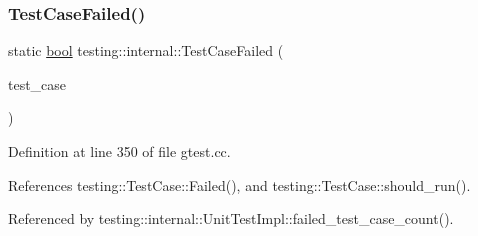 \mbox{\label{namespacetesting_1_1internal_a53454b6089c1c5b25319caa9de6c5c02}} 
\subsubsection{\texorpdfstring{Test\+Case\+Failed()}{TestCaseFailed()}}
{\footnotesize\ttfamily static \hyperlink{classbool}{bool} testing\+::internal\+::\+Test\+Case\+Failed (\begin{DoxyParamCaption}\item[{const \hyperlink{classtesting_1_1TestCase}{Test\+Case} $\ast$}]{test\+\_\+case }\end{DoxyParamCaption})\hspace{0.3cm}{\ttfamily [static]}}



Definition at line 350 of file gtest.\+cc.



References testing\+::\+Test\+Case\+::\+Failed(), and testing\+::\+Test\+Case\+::should\+\_\+run().



Referenced by testing\+::internal\+::\+Unit\+Test\+Impl\+::failed\+\_\+test\+\_\+case\+\_\+count().


